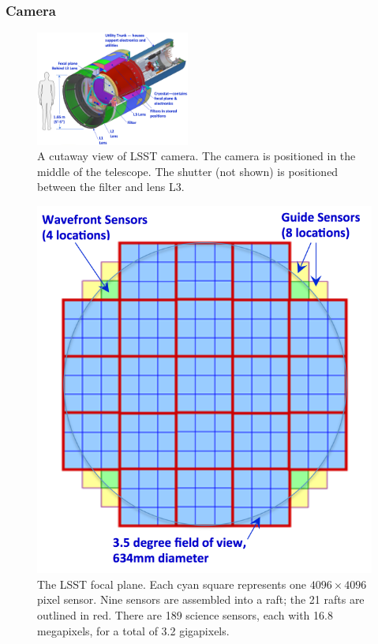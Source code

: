 \documentclass{emulateapj}
\begin{document}
\vskip 0.2in
\subsubsection{ Camera }


\begin{figure}[t!]
\hskip 0.1in
\includegraphics[width=0.45\textwidth]{CameraFigureUpdated.pdf}
\caption{A cutaway view of LSST camera. The camera is positioned in the middle of the telescope.  The shutter (not shown) is positioned between the filter and lens L3.} 
\label{Fig:camera}
\end{figure}


\begin{figure}[ht]
\includegraphics[width=1.0\hsize,clip]{fov-updated-cropped.pdf}
\caption{The LSST focal plane. Each cyan square represents one
$4096\times4096$ pixel sensor. Nine sensors are assembled into a
raft; the 21 rafts are outlined in red. There are 189 science sensors, each 
with 16.8 megapixels, for a total of 3.2 gigapixels.} 
\label{Fig:fov}
\end{figure}
\end{document}
